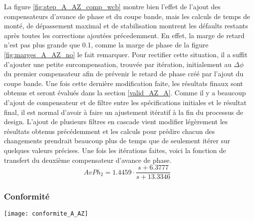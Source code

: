 \documentclass{udes_rapport} %
\begin{document}
La figure \ref{fig:step_A_AZ_comp_wcb} montre bien l'effet de l'ajout des compensateurs d'avance de phase et du coupe bande, mais les calculs de temps de monté, de dépassement maximal et de stabilisation montrent les défaults restants après toutes les corrections ajoutées précedemment. En effet, la marge de retard n'est pas plus grande que 0.1, comme la marge de phase de la figure \ref{fig:marges_A_AZ_no} le fait remarquer. Pour rectifier cette situation, il a suffit d'ajouter une petite surcompensation, trouvée par itération, initialement au $\Delta \phi$ du premier compensateur afin de prévenir le retard de phase créé par l'ajout du coupe bande. Une fois cette dernière modification faite, les résultats finaux sont obtenus et seront évalués dans la section \ref{valid_AZ_A}. Comme il y a beaucoup d'ajout de compensateur et de filtre entre les spécifications initiales et le résultat final, il est normal d'avoir à faire un ajustement itératif à la fin du processus de design. L'ajout de plusieurs filtres en cascade vient modifier légèrement les résultats obtenus précédemment et les calculs pour prédire chacun des changements prendrait beaucoup plus de temps que de seulement itérer sur quelques valeurs précises. Une fois les itérations faites, voici la fonction de transfert du deuxième compensateur d'avance de phase.
\[ AvPh_2 =  1.4459 \cdot \frac{s+6.3777}{s+13.3346}\]





\newpage
\subsubsection{Conformité}
\begin{center}
  \label{tab:conformite_A_AZ}
  \texttt{[image: conformite\_A\_AZ]}
\end{center}
\end{document}
